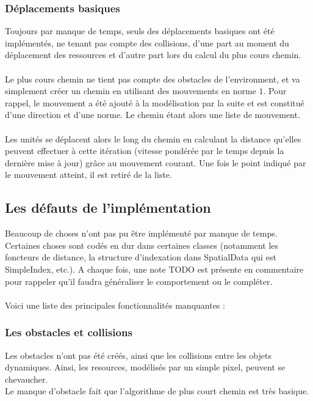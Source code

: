 \subsubsection{Déplacements basiques}

Toujours par manque de temps, seuls des déplacements basiques ont été implémentés, ne tenant pas compte des collisions, d'une part au moment du déplacement des ressources et d'autre part lors du calcul du plus cours chemin.\\\\

Le plus cours chemin ne tient pas compte des obstacles de l'environment, et va simplement créer un chemin en utilisant des mouvements en norme $1$. Pour rappel, le mouvement a été ajouté à la modélisation par la suite et est constitué d'une direction et d'une norme. Le chemin étant alors une liste de mouvement.\\\\

Les unités se déplacent alors le long du chemin en calculant la distance qu'elles peuvent effectuer à cette itération (vitesse pondérée par le temps depuis la dernière mise à jour) grâce au mouvement courant. Une fois le point indiqué par le mouvement atteint, il est retiré de la liste.


\subsection{Les défauts de l'implémentation}
Beaucoup de choses n'ont pas pu être implémenté par manque de temps. \\
Certaines choses sont codés en \og dur \fg{} dans certaines classes (notamment les foncteurs de distance, la structure d'indexation dans SpatialData qui est SimpleIndex, etc.). A chaque fois, une note TODO est présente en commentaire pour rappeler qu'il faudra généraliser le comportement ou le compléter.\\\\

Voici une liste des principales fonctionnalités manquantes :
\subsubsection{Les obstacles et collisions}

Les obstacles n'ont pas été créés, ainsi que les collisions entre les objets dynamiques. Ainsi, les resources, modélisés par un simple pixel, peuvent se chevaucher.\\
Le manque d'obstacle fait que l'algorithme de plus court chemin est très basique.

